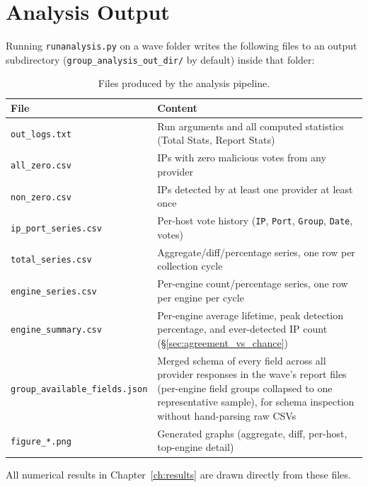 \documentclass[12pt, a4paper, twoside]{report}
\begin{document}
\section{Analysis Output}

Running \texttt{runanalysis.py} on a wave folder writes the following files to an output
subdirectory (\texttt{group\_analysis\_out\_dir/} by default) inside that folder:

\begin{table}[h]
  \centering
  \caption{Files produced by the analysis pipeline.}
  \label{tab:analysis_output}
  \begin{tabularx}{\linewidth}{lX}
    \toprule
    \textbf{File} & \textbf{Content} \\
    \midrule
    \texttt{out\_logs.txt}       & Run arguments and all computed statistics (Total Stats, Report Stats) \\
    \texttt{all\_zero.csv}       & IPs with zero malicious votes from any provider \\
    \texttt{non\_zero.csv}       & IPs detected by at least one provider at least once \\
    \texttt{ip\_port\_series.csv}  & Per-host vote history (\texttt{IP}, \texttt{Port}, \texttt{Group}, \texttt{Date}, votes) \\
    \texttt{total\_series.csv}   & Aggregate/diff/percentage series, one row per collection cycle \\
    \texttt{engine\_series.csv}  & Per-engine count/percentage series, one row per engine per cycle \\
    \texttt{engine\_summary.csv} & Per-engine average lifetime, peak detection percentage, and
      ever-detected IP count (\S\ref{sec:agreement_vs_chance}) \\
    \texttt{group\_available\_fields.json} & Merged schema of every field across all provider
      responses in the wave's report files (per-engine field groups collapsed to one
      representative sample), for schema inspection without hand-parsing raw CSVs \\
    \texttt{figure\_*.png}       & Generated graphs (aggregate, diff, per-host, top-engine detail) \\
    \bottomrule
  \end{tabularx}
\end{table}

All numerical results in Chapter~\ref{ch:results} are drawn directly from these files.

\end{document}
